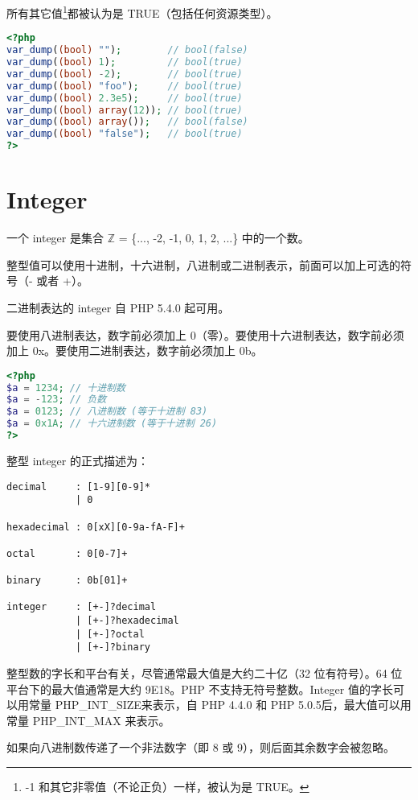 所有其它值\footnote{-1 和其它非零值（不论正负）一样，被认为是 TRUE。}都被认为是 TRUE（包括任何资源类型）。


\begin{lstlisting}[language=PHP]
<?php
var_dump((bool) "");        // bool(false)
var_dump((bool) 1);         // bool(true)
var_dump((bool) -2);        // bool(true)
var_dump((bool) "foo");     // bool(true)
var_dump((bool) 2.3e5);     // bool(true)
var_dump((bool) array(12)); // bool(true)
var_dump((bool) array());   // bool(false)
var_dump((bool) "false");   // bool(true)
?>
\end{lstlisting}


\section{Integer}

一个 integer 是集合 $\mathbb{Z}$ = \{..., -2, -1, 0, 1, 2, ...\} 中的一个数。

整型值可以使用十进制，十六进制，八进制或二进制表示，前面可以加上可选的符号（- 或者 +）。

二进制表达的 integer 自 PHP 5.4.0 起可用。

要使用八进制表达，数字前必须加上 0（零）。要使用十六进制表达，数字前必须加上 0x。要使用二进制表达，数字前必须加上 0b。

\begin{lstlisting}[language=PHP]
<?php
$a = 1234; // 十进制数
$a = -123; // 负数
$a = 0123; // 八进制数 (等于十进制 83)
$a = 0x1A; // 十六进制数 (等于十进制 26)
?>
\end{lstlisting}


整型 integer 的正式描述为：

\begin{verbatim}
decimal     : [1-9][0-9]*
            | 0

hexadecimal : 0[xX][0-9a-fA-F]+

octal       : 0[0-7]+

binary      : 0b[01]+

integer     : [+-]?decimal
            | [+-]?hexadecimal
            | [+-]?octal
            | [+-]?binary
\end{verbatim}


整型数的字长和平台有关，尽管通常最大值是大约二十亿（32 位有符号）。64 位平台下的最大值通常是大约 9E18。PHP 不支持无符号整数。Integer 值的字长可以用常量 PHP\_INT\_SIZE来表示，自 PHP 4.4.0 和 PHP 5.0.5后，最大值可以用常量 PHP\_INT\_MAX 来表示。


如果向八进制数传递了一个非法数字（即 8 或 9），则后面其余数字会被忽略。

